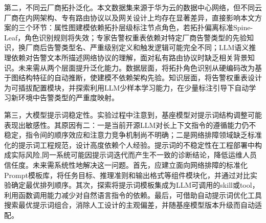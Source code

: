 第二，不同云厂商拓扑泛化。本文数据集来源于华为云的数据中心网络，但不同云厂商在内网架构、专有路由协议以及网关设计上均存在显著差异，直接影响本文方案的三个环节：属性图建模依赖拓扑层级标注节点角色，若拓扑偏离标准Spine-Leaf，角色识别规则将失效；专家告警权重表依赖对特定厂商告警类型的先验知识，换厂商后告警类型名、严重级别定义和触发逻辑可能完全不同；LLM语义推理依赖对告警文本所描述网络协议的理解，面对私有路由协议时缺乏相关背景知识。未来需从两个层面提升泛化能力。数据层面，将拓扑角色识别从硬编码改为基于图结构特征的自动推断，使建模不依赖架构先验。知识层面，将告警权重表设计为可插拔配置模块，并探索利用LLM少样本学习能力，在少量标注引导下自动学习新环境中告警类型的严重度映射。

第三，大模型提示词稳定性。实验过程中注意到，基座模型对提示词结构调整可能表现出敏感性。其原因有二：一是当前开源LLM对长上下文指令的遵循能力仍不稳定，指令间的顺序效应和注意力竞争机制尚不明确；二是网络排障领域缺乏标准化的提示词工程规范，设计高度依赖个人经验。提示词的不稳定性在工程部署中构成实际风险,同一系统可能因提示词迭代而产生不一致的诊断结论，降低运维人员信任度。未来需系统性地解决这一问题。首先，应建立面向网络排障的标准化Prompt模板库，将任务目标、推理准则和输出格式等组件模块化，并通过对比实验确定最优排列顺序。其次，探索将提示词模板集成为LLM可调用的skill或tool，利用函数调用能力减少对自然语言指令的依赖。最后，可借助自动提示词优化工具搜索最优提示词组合，消除人工设计的主观偏差，并随基座模型版本升级而自动适配。

